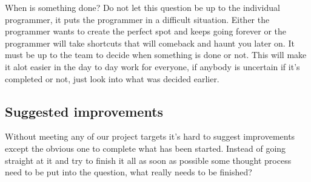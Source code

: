 When is something done?
Do not let this question be up to the individual programmer, it puts the programmer in a difficult situation.
Either the programmer wants to create the perfect spot and keeps going forever or the programmer will take shortcuts that will comeback and haunt you later on.
It must be up to the team to decide when something is done or not.
This will make it alot easier in the day to day work for everyone, if anybody is uncertain if it's completed or not, just look into what was decided earlier.
\subsection{Suggested improvements}
Without meeting any of our project targets it's hard to suggest improvements except the obvious one to complete what has been started. 
Instead of going straight at it and try to finish it all as soon as possible some thought process need to be put into the question, what really needs to be finished?

%
%

